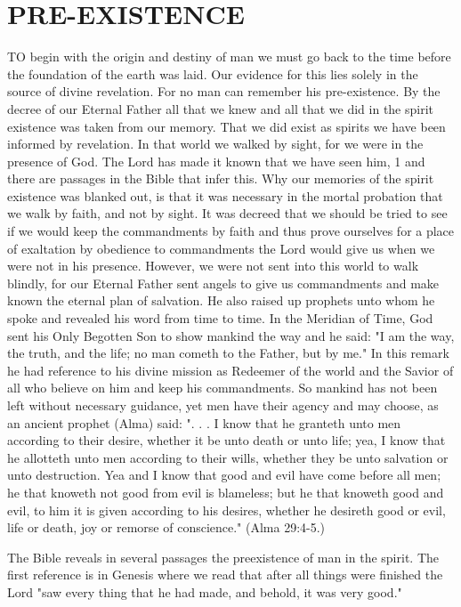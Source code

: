 \chapter{PRE-EXISTENCE}

TO begin with the origin and destiny of man we must go back to the time before the
foundation of the earth was laid. Our evidence for this lies solely in the source of divine
revelation. For no man can remember his pre-existence. By the decree of our Eternal Father
all that we knew and all that we did in the spirit existence was taken from our memory. That
we did exist as spirits we have been informed by revelation. In that world we walked by
sight, for we were in the presence of God. The Lord has made it known that we have seen
him, 1 and there are passages in the Bible that infer this. Why our memories of the spirit
existence was blanked out, is that it was necessary in the mortal probation that we walk by
faith, and not by sight. It was decreed that we should be tried to see if we would keep the
commandments by faith and thus prove ourselves for a place of exaltation by obedience to
commandments the Lord would give us when we were not in his presence. However, we
were not sent into this world to walk blindly, for our Eternal Father sent angels to give us
commandments and make known the eternal plan of salvation. He also raised up prophets
unto whom he spoke and revealed his word from time to time. In the Meridian of Time, God
sent his Only Begotten Son to show mankind the way and he said: "I am the way, the truth,
and the life; no man cometh to the Father, but by me." In this remark he had reference to his
divine mission as Redeemer of the world and the Savior of all who believe on him and keep
his commandments. So mankind has not been left without necessary guidance, yet men have
their agency and may choose, as an ancient prophet (Alma) said: ". . . I know that he granteth
unto men according to their desire, whether it be unto death or unto life; yea, I know that he
allotteth unto men according to their wills, whether they be unto salvation or unto
destruction. Yea and I know that good and evil have come before all men; he that knoweth
not good from evil is blameless; but he that knoweth good and evil, to him it is given
according to his desires, whether he desireth good or evil, life or death, joy or remorse of
conscience." (Alma 29:4-5.)

The Bible reveals in several passages the preexistence of man in the spirit. The first reference
is in Genesis where we read that after all things were finished the Lord "saw every thing that
he had made, and behold, it was very good."

